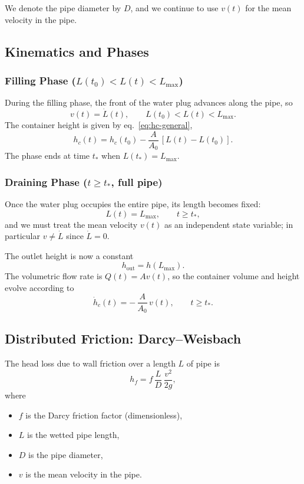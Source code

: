\documentclass[11pt]{article}
\begin{document}
We denote the pipe diameter by $D$, and we continue to use $v(t)$ for the mean
velocity in the pipe.

\subsection{Kinematics and Phases}

\subsubsection*{Filling Phase ($L(t_0) < L(t) < L_{\max}$)}

During the filling phase, the front of the water plug advances along the pipe,
so
\begin{equation}
  v(t) = \dot L(t), \qquad L(t_0) < L(t) < L_{\max}.
\end{equation}
The container height is given by eq.~\eqref{eq:hc-general},
\[
h_c(t) = h_c(t_0) - \frac{A}{A_0}\,[L(t)-L(t_0)].
\]
The phase ends at time $t_\ast$ when $L(t_\ast) = L_{\max}$.

\subsubsection*{Draining Phase ($t \ge t_\ast$, full pipe)}

Once the water plug occupies the entire pipe, its length becomes fixed:
\[
L(t) = L_{\max}, \qquad t \ge t_\ast,
\]
and we must treat the mean velocity $v(t)$ as an independent state variable;
in particular $v \neq \dot L$ since $\dot L = 0$.

The outlet height is now a constant
\[
h_{\text{out}} = h(L_{\max}).
\]
The volumetric flow rate is $Q(t) = A v(t)$, so the container volume and height
evolve according to
\begin{equation}
  \dot h_c(t) = -\,\frac{A}{A_0}\,v(t),
  \qquad t \ge t_\ast.
  \label{eq:hc-draining}
\end{equation}

\subsection{Distributed Friction: Darcy--Weisbach}

The head loss due to wall friction over a length $L$ of pipe is
\begin{equation}
  h_f = f\,\frac{L}{D}\,\frac{v^2}{2g},
\end{equation}
where
\begin{itemize}
  \item $f$ is the Darcy friction factor (dimensionless),
  \item $L$ is the wetted pipe length,
  \item $D$ is the pipe diameter,
  \item $v$ is the mean velocity in the pipe.
\end{itemize}
\end{document}
